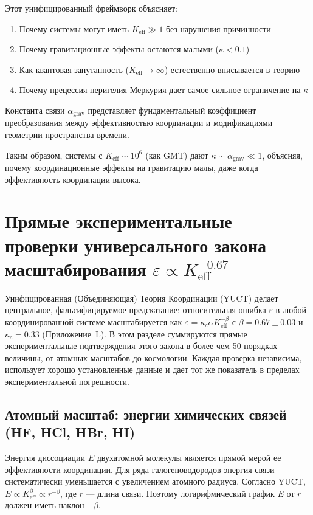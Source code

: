 \documentclass[11pt,a4paper]{article}
\begin{document}
	Этот унифицированный фреймворк объясняет:
	\begin{enumerate}
		\item Почему системы могут иметь $K_{\mathrm{eff}} \gg 1$ без нарушения причинности
		\item Почему гравитационные эффекты остаются малыми ($\kappa < 0.1$)
		\item Как квантовая запутанность ($K_{\mathrm{eff}} \to\infty$) естественно вписывается в теорию
		\item Почему прецессия перигелия Меркурия дает самое сильное ограничение на $\kappa$
	\end{enumerate}
	
	Константа связи $\alpha_{\text{grav}}$ представляет фундаментальный коэффициент преобразования между эффективностью координации и модификациями геометрии пространства-времени.
	
	Таким образом, системы с $K_{\mathrm{eff}} \sim 10^6$ (как GMT) дают $\kappa \sim \alpha_{\text{grav}} \ll 1$, объясняя, почему координационные эффекты на гравитацию малы, даже когда эффективность координации высока.
	
	
	\section{Прямые экспериментальные проверки универсального закона масштабирования \(\varepsilon \propto K_{\mathrm{eff}}^{-0.67}\)}
	\label{sec:experimental-verifications}
	
	Унифицированная (Объединяющая) Теория Координации (YUCT) делает центральное, фальсифицируемое предсказание: относительная ошибка \(\varepsilon\) в любой координированной системе масштабируется как \(\varepsilon = \kappa_c \alpha K_{\mathrm{eff}}^{-\beta}\) с \(\beta = 0.67 \pm 0.03\) и \(\kappa_c = 0.33\) (Приложение~L). В этом разделе суммируются прямые экспериментальные подтверждения этого закона в более чем 50 порядках величины, от атомных масштабов до космологии. Каждая проверка независима, использует хорошо установленные данные и дает тот же показатель в пределах экспериментальной погрешности.
	
	\subsection{Атомный масштаб: энергии химических связей (HF, HCl, HBr, HI)}
	\label{subsec:chem-bonds}
	
	Энергия диссоциации \(E\) двухатомной молекулы является прямой мерой ее эффективности координации. Для ряда галогеноводородов энергия связи систематически уменьшается с увеличением атомного радиуса. Согласно YUCT, \(E \propto K_{\mathrm{eff}}^{\beta} \propto r^{-\beta}\), где \(r\) — длина связи. Поэтому логарифмический график \(E\) от \(r\) должен иметь наклон \(-\beta\).
	
\end{document}
